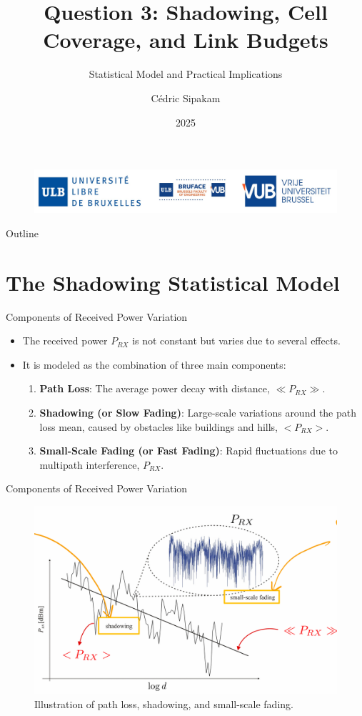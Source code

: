\documentclass{beamer}
\title[Shadowing, Cell Coverage, and Link Budgets]{Question 3: Shadowing, Cell Coverage, and Link Budgets}
\subtitle{Statistical Model and Practical Implications}
\author{Cédric Sipakam}
\institute{ULB | VUB \\
	\vspace{1.5em}
	ELEC-H415: Communication Channels}
\date{2025}
\begin{document}
	\begin{frame}
		\begin{figure}
			\centering
			\includegraphics[width=0.7\linewidth]{pictures/logos}
		\end{figure}
		\titlepage
	\end{frame}
	
	\begin{frame}{Outline}
		\tableofcontents
	\end{frame}
	
	\section{The Shadowing Statistical Model}
	
	\begin{frame}{Components of Received Power Variation}
		\begin{itemize}
			\item The received power $P_{RX}$ is not constant but varies due to several effects.
			\item It is modeled as the combination of three main components:
			\begin{enumerate}
				\item \textbf{Path Loss}: The average power decay with distance, $\ll P_{RX} \gg$.
				\item \textbf{Shadowing (or Slow Fading)}: Large-scale variations around the path loss mean, caused by obstacles like buildings and hills, $<P_{RX}>$.
				\item \textbf{Small-Scale Fading (or Fast Fading)}: Rapid fluctuations due to multipath interference, $P_{RX}$.
			\end{enumerate}
		\end{itemize}
	\end{frame}
	
	\begin{frame}{Components of Received Power Variation}
		\begin{figure}
			\centering
			\includegraphics[width=0.8\linewidth]{"pictures/power-components.png"}
			\caption{Illustration of path loss, shadowing, and small-scale fading.}
		\end{figure}
	\end{frame}
	
\end{document}
